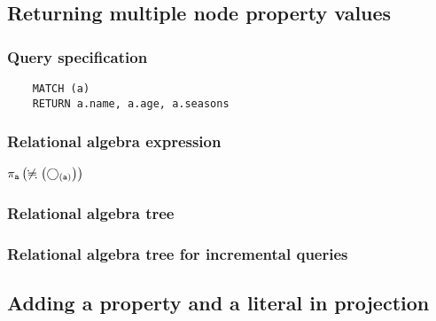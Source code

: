 	\subsection{Returning multiple node property values}

	\subsubsection*{Query specification}

	\begin{lstlisting}
	MATCH (a)
	RETURN a.name, a.age, a.seasons
	\end{lstlisting}


	\subsubsection*{Relational algebra expression}

	$\projection{\var{a}} \left(\alldifferent{} \left(\getvertices{a}{}\right)\right)$

	\subsubsection*{Relational algebra tree}


	\subsubsection*{Relational algebra tree for incremental queries}

	\subsection{Adding a property and a literal in projection}

